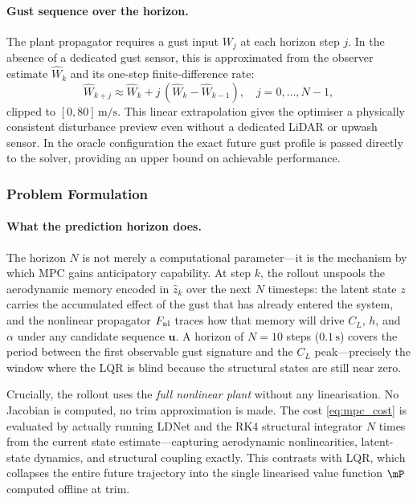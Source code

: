 \paragraph{Gust sequence over the horizon.}
\label{sec:gust_seq}
The plant propagator requires a gust input $W_j$ at each horizon step $j$.
In the absence of a dedicated gust sensor, this is approximated from the
observer estimate $\hat{W}_k$ and its one-step finite-difference rate:
\begin{equation}
  \hat{W}_{k+j} \approx \hat{W}_k + j\,(\hat{W}_k - \hat{W}_{k-1}),
  \quad j = 0,\ldots,N-1,
  \label{eq:W_extrap}
\end{equation}
clipped to $[0, 80]\,\text{m/s}$.
This linear extrapolation gives the optimiser a physically consistent
disturbance preview even without a dedicated LiDAR or upwash sensor.
In the oracle configuration the exact future gust profile is passed directly to
the solver, providing an upper bound on achievable performance.

\subsubsection{Problem Formulation}
\label{sec:mpc_formulation}

\paragraph{What the prediction horizon does.}
The horizon $N$ is not merely a computational parameter---it is the mechanism
by which MPC gains anticipatory capability.
At step $k$, the rollout unspools the aerodynamic memory encoded in $\hat{z}_k$
over the next $N$ timesteps: the latent state $z$ carries the accumulated effect
of the gust that has already entered the system, and the nonlinear propagator
$F_{\rm nl}$ traces how that memory will drive $C_L$, $h$, and $\alpha$ under
any candidate sequence $\mathbf{u}$.
A horizon of $N = 10$ steps ($0.1\,\text{s}$) covers the period between the
first observable gust signature and the $C_L$ peak---precisely the window where
the LQR is blind because the structural states are still near zero.

Crucially, the rollout uses the \emph{full nonlinear plant} without any
linearisation.
No Jacobian is computed, no trim approximation is made.
The cost \eqref{eq:mpc_cost} is evaluated by actually running LDNet and the
RK4 structural integrator $N$ times from the current state estimate---capturing
aerodynamic nonlinearities, latent-state dynamics, and structural coupling
exactly.
This contrasts with LQR, which collapses the entire future trajectory into the
single linearised value function $\mP$ computed offline at trim.

